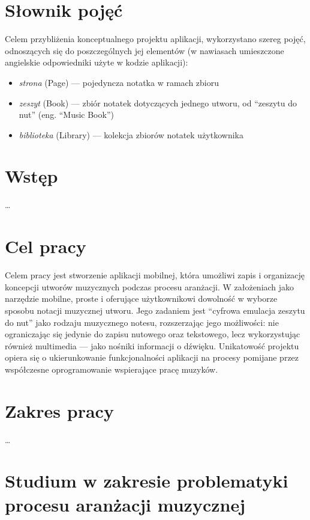 \documentclass[12pt]{article}
\begin{document}
\newpage
\clearpage
\tableofcontents

\newpage
{}
\section*{Słownik pojęć}
Celem przybliżenia konceptualnego projektu aplikacji, wykorzystano szereg pojęć, odnoszących się do poszczególnych jej
elementów (w nawiasach umieszczone angielskie odpowiedniki użyte w kodzie aplikacji):
\begin{itemize}
	\item \textit{strona} (Page) — pojedyncza notatka w ramach zbioru
	\item \textit{zeszyt} (Book) — zbiór notatek dotyczących jednego utworu, od \enquote{zeszytu do nut} (eng. \enquote{Music Book})
	\item \textit{biblioteka} (Library) — kolekcja zbiorów notatek użytkownika
\end{itemize}

\newpage
{}
\section*{Wstęp}
…

\newpage
{}
\section*{Cel pracy}
Celem pracy jest stworzenie aplikacji mobilnej, która umożliwi zapis i organizację koncepcji utworów muzycznych podczas procesu aranżacji.
W założeniach jako narzędzie mobilne, proste i oferujące użytkownikowi dowolność w wyborze sposobu notacji muzycznej utworu.
Jego zadaniem jest \enquote{cyfrowa emulacja zeszytu do nut} jako rodzaju muzycznego notesu, rozszerzając jego możliwości: nie
ograniczając się jedynie do zapisu nutowego oraz tekstowego, lecz wykorzystując również multimedia — jako nośniki informacji o dźwięku.
Unikatowość projektu opiera się o ukierunkowanie funkcjonalności aplikacji na procesy pomijane przez współczesne oprogramowanie
wspierające pracę muzyków.

\newpage
{}
\section*{Zakres pracy}
…

\newpage
\section{Studium w zakresie problematyki procesu aranżacji muzycznej}

\end{document}
